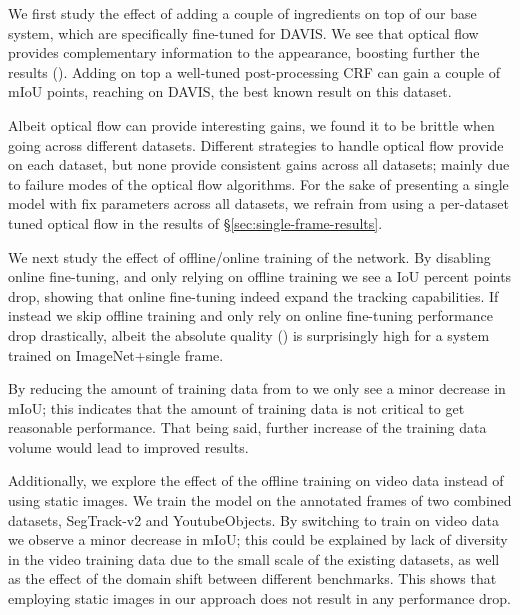 \documentclass[10pt,twocolumn,letterpaper]{article}
\makeatletter
\renewcommand{\paragraph}{\@startsection{paragraph}{4}{\z@}{0.5ex \@plus 1ex \@minus .2ex}{-0.5em}{\normalfont \normalsize \bfseries}}
\newcommand{\segtrack}{SegTrack-v2}
\makeatother
\begin{document}
\paragraph{Add-ons}
We first study the effect of adding a couple of ingredients on top of our base  system, which are specifically fine-tuned for DAVIS.
We see that optical flow provides complementary information to the appearance, boosting further the results (). Adding on top a well-tuned post-processing CRF \cite{Kraehenbuehl2011Nips}
can gain a couple of mIoU points, reaching  on DAVIS, the best known result on this dataset.

Albeit optical flow can provide interesting gains, we found it to be brittle when going across different datasets. Different strategies to handle optical flow provide 
on each dataset,
but none provide consistent gains across all datasets; mainly due to failure modes of the optical flow algorithms. For the sake of presenting a single model with fix parameters across all datasets, we refrain from using
a per-dataset tuned optical flow in the results of \S\ref{sec:single-frame-results}.

\paragraph{Training}
We next study the effect of offline/online training of the network.
By disabling online fine-tuning, and only relying on offline training we see a  IoU percent points drop, showing that online fine-tuning indeed expand the tracking capabilities.
If instead we skip offline training and only rely on online fine-tuning performance drop drastically, albeit the absolute quality () is surprisingly high for a system trained on ImageNet+single frame.

By reducing the amount of training data from  to  we only see a minor decrease in mIoU; this indicates that the amount of training data is not critical to get reasonable performance.
That being said, further increase of the training data volume would lead to improved results.


Additionally, we explore the effect of the offline training on video data instead of using static images. We train the model on the annotated frames of two combined datasets, \segtrack{} and YoutubeObjects.
By switching to train on video data we observe a minor decrease in mIoU; this could be explained by lack of diversity in the video training data due to the small scale of the existing datasets,
as well as the effect of the domain shift between different benchmarks. This shows that employing static images in our approach does not result in any performance drop.
\end{document}
